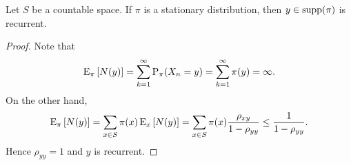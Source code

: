 \begin{theorem}
    Let $S$ be a countable space. If $\pi$ is a stationary distribution, 
    then $y\in\supp{\pi}$ is recurrent. 
\end{theorem}
\begin{proof}
    Note that 
    \begin{equation*}
        \operatorname{E}_\pi\left[ {N(y)} \right] = \sum_{k=1}^\infty \operatorname{P}_\pi(X_n = y) = \sum_{k=1}^\infty \pi(y) = \infty.
    \end{equation*}
    On the other hand, 
    \begin{equation*}
        \operatorname{E}_\pi\left[ {N(y)} \right] = \sum_{x\in S} \pi(x)\operatorname{E}_x\left[ {N(y)} \right] 
        = \sum_{x\in S}\pi(x)\frac{\rho_{xy}}{1-\rho_{yy}}\leq \frac{1}{1-\rho_{yy}}. 
    \end{equation*}
    Hence $\rho_{yy}=1$ and $y$ is recurrent. 
\end{proof}

